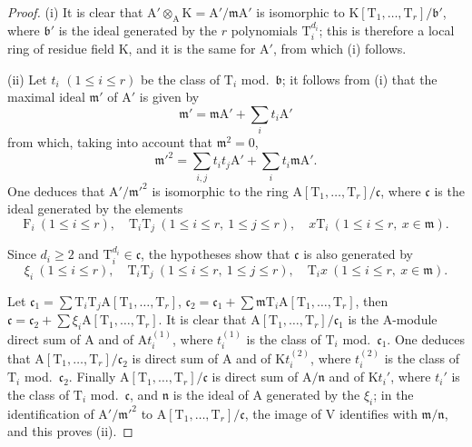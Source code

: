 \begin{proof}
(i) It is clear that $\mathrm{A}'\otimes_\mathrm{A}\mathrm{K}=\mathrm{A}'/\mathfrak{m}\mathrm{A}'$ is isomorphic to $\mathrm{K}[\mathrm{T}_1,\ldots,\mathrm{T}_r]/\mathfrak{b}'$, where $\mathfrak{b}'$ is the ideal generated by the $r$ polynomials $\mathrm{T}_i^{d_i}$; this is therefore a local ring of residue field $\mathrm{K}$, and it is the same for $\mathrm{A}'$, from which (i) follows.

(ii) Let $t_i$ $(1\leq i\leq r)$ be the class of $\mathrm{T}_i$ mod.~$\mathfrak{b}$; it follows from (i) that the maximal ideal $\mathfrak{m}'$ of $\mathrm{A}'$ is given by
\[
  \mathfrak{m}'=\mathfrak{m}\mathrm{A}'+\sum_i t_i\mathrm{A}'
\]
from which, taking into account that $\mathfrak{m}^2=0$,
\[
  \mathfrak{m}'^2=\sum_{i,j}t_it_j\mathrm{A}'+\sum_i t_i\mathfrak{m}\mathrm{A}'.
\]
One deduces that $\mathrm{A}'/\mathfrak{m}'^2$ is isomorphic to the ring $\mathrm{A}[\mathrm{T}_1,\ldots,\mathrm{T}_r]/\mathfrak{c}$, where $\mathfrak{c}$ is the ideal generated by the elements
\[
  \mathrm{F}_i\ (1\leq i\leq r),\quad \mathrm{T}_i\mathrm{T}_j\ (1\leq i\leq r,\ 1\leq j\leq r),\quad x\mathrm{T}_i\ (1\leq i\leq r,\ x\in\mathfrak{m}).
\]

Since $d_i\geq 2$ and $\mathrm{T}_i^{d_i}\in\mathfrak{c}$, the hypotheses show that $\mathfrak{c}$ is also generated by
\[
  \xi_i\ (1\leq i\leq r),\quad \mathrm{T}_i\mathrm{T}_j\ (1\leq i\leq r,\ 1\leq j\leq r),\quad \mathrm{T}_i x\ (1\leq i\leq r,\ x\in\mathfrak{m}).
\]

Let $\mathfrak{c}_1=\sum\mathrm{T}_i\mathrm{T}_j\mathrm{A}[\mathrm{T}_1,\ldots,\mathrm{T}_r]$, $\mathfrak{c}_2=\mathfrak{c}_1+\sum\mathfrak{m}\mathrm{T}_i\mathrm{A}[\mathrm{T}_1,\ldots,\mathrm{T}_r]$, then $\mathfrak{c}=\mathfrak{c}_2+\sum\xi_i\mathrm{A}[\mathrm{T}_1,\ldots,\mathrm{T}_r]$.
It is clear that $\mathrm{A}[\mathrm{T}_1,\ldots,\mathrm{T}_r]/\mathfrak{c}_1$ is the $\mathrm{A}$-module direct sum of $\mathrm{A}$ and of $\mathrm{A}t_i^{(1)}$, where $t_i^{(1)}$ is the class of $\mathrm{T}_i$ mod.~$\mathfrak{c}_1$.
One deduces that $\mathrm{A}[\mathrm{T}_1,\ldots,\mathrm{T}_r]/\mathfrak{c}_2$ is direct sum of $\mathrm{A}$ and of $\mathrm{K}t_i^{(2)}$, where $t_i^{(2)}$ is the class of $\mathrm{T}_i$ mod.~$\mathfrak{c}_2$.
Finally $\mathrm{A}[\mathrm{T}_1,\ldots,\mathrm{T}_r]/\mathfrak{c}$ is direct sum of $\mathrm{A}/\mathfrak{n}$ and of $\mathrm{K}t_i'$, where $t_i'$ is the class of $\mathrm{T}_i$ mod.~$\mathfrak{c}$, and $\mathfrak{n}$ is the ideal of $\mathrm{A}$ generated by the $\xi_i$; in the identification of $\mathrm{A}'/\mathfrak{m}'^2$ to $\mathrm{A}[\mathrm{T}_1,\ldots,\mathrm{T}_r]/\mathfrak{c}$, the image of $\mathrm{V}$ identifies with $\mathfrak{m}/\mathfrak{n}$, and this proves (ii).
\end{proof}


